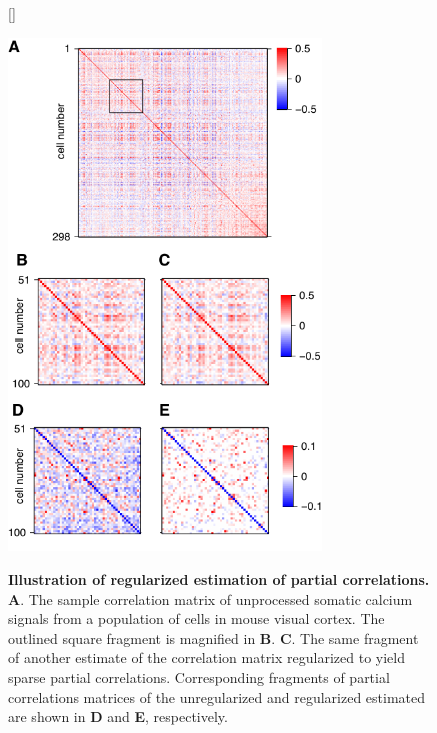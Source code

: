 \documentclass[10pt]{article}
\begin{document}
\begin{figure}[!ht]
    [\FBwidth]
    {\caption{{\bf Illustration of regularized estimation of partial correlations.}
        {\bf A}. The sample correlation matrix of unprocessed somatic calcium signals from a population of cells in mouse visual cortex.
        The outlined square fragment is magnified in {\bf B}.
        {\bf C}. The same fragment of another estimate of the correlation matrix regularized to yield sparse partial correlations.
        Corresponding fragments of partial correlations matrices of the unregularized and regularized estimated are shown in {\bf D} and {\bf E}, respectively.
    }
    \label{fig:01}}
    {\includegraphics[width=8.3cm]{./figures/Figure01.pdf}}
\end{figure}
\end{document}
